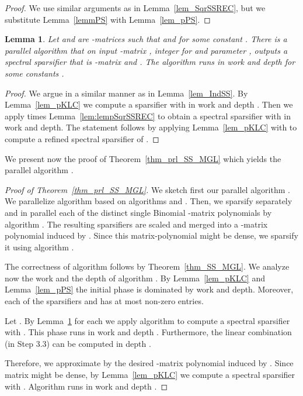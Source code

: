 \documentclass[11pt]{article}
\newcommand{\lemref}[1]{Lemma~\ref{lem:#1}}
\newcommand{\mylemma}[2]{\begin{lem}\label{lem:#1}#2\end{lem}}
\newtheorem{lem}[thm]{Lemma}
\numberwithin{thm}{section}
\begin{document}
\begin{proof}
We use similar arguments as in Lemma~\ref{lem_SqrSSREC}, but we substitute Lemma~\ref{lemmPS} with Lemma~\ref{lem_pPS}.
\end{proof}

\newcommand{\lempIndSS}
{
Let  and 
are -matrices such that  and  for some constant . There is a parallel algorithm  that on input -matrix , integer  for  and parameter , outputs a spectral sparsifier  that is -matrix and . The algorithm runs in work  and depth  for some constants .
}
\mylemma{lempIndSS}{\lempIndSS}

\begin{proof}
We argue in a similar manner as in Lemma~\ref{lem_IndSS}. By Lemma~\ref{lem_pKLC} we compute a sparsifier  with  in work  and depth . Then we apply  times \lemref{lempSqrSSREC} to obtain a spectral sparsifier  with  in  work and  depth. The statement follows by applying Lemma~\ref{lem_pKLC} with  to compute a refined spectral sparsifier of .
\end{proof}

We present now the proof of Theorem~\ref{thm_prl_SS_MGL} which yields the parallel algorithm .

\begin{proof}[Proof of Theorem~\ref{thm_prl_SS_MGL}]
We sketch first our parallel algorithm . We parallelize algorithm  based on algorithms  and . Then, we sparsify separately and in parallel each of the  distinct single Binomial -matrix polynomials by algorithm . The resulting  sparsifiers are scaled and merged into a -matrix polynomial induced by . Since this matrix-polynomial might be dense, we sparsify it using algorithm .

The correctness of algorithm  follows by Theorem~\ref{thm_SS_MGL}. We analyze now the work and the depth of algorithm . By Lemma~\ref{lem_pKLC} and Lemma~\ref{lem_pPS} the initial phase is dominated by  work and  depth. Moreover, each of the sparsifiers  and  has at most  non-zero entries.

Let . By \lemref{lempIndSS} for each  we apply algorithm  to compute a spectral sparsifier  with . This phase runs in work  and depth . Furthermore, the linear combination  (in Step 3.3) can be computed in depth .

Therefore, we approximate by  the desired -matrix polynomial induced by . Since matrix  might be dense, by Lemma~\ref{lem_pKLC} we compute a spectral sparsifier  with . Algorithm  runs in work
 and depth .
\end{proof}
\end{document}
